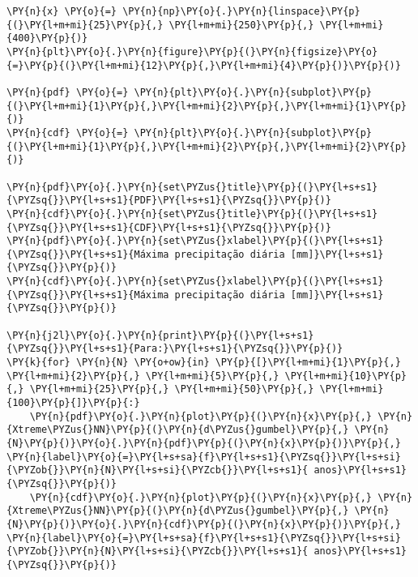     \begin{tcolorbox}[breakable, size=fbox, boxrule=1pt, pad at break*=1mm,colback=cellbackground, colframe=cellborder]
\begin{Verbatim}[commandchars=\\\{\}]
\PY{n}{x} \PY{o}{=} \PY{n}{np}\PY{o}{.}\PY{n}{linspace}\PY{p}{(}\PY{l+m+mi}{25}\PY{p}{,} \PY{l+m+mi}{250}\PY{p}{,} \PY{l+m+mi}{400}\PY{p}{)}
\PY{n}{plt}\PY{o}{.}\PY{n}{figure}\PY{p}{(}\PY{n}{figsize}\PY{o}{=}\PY{p}{(}\PY{l+m+mi}{12}\PY{p}{,}\PY{l+m+mi}{4}\PY{p}{)}\PY{p}{)}

\PY{n}{pdf} \PY{o}{=} \PY{n}{plt}\PY{o}{.}\PY{n}{subplot}\PY{p}{(}\PY{l+m+mi}{1}\PY{p}{,}\PY{l+m+mi}{2}\PY{p}{,}\PY{l+m+mi}{1}\PY{p}{)}
\PY{n}{cdf} \PY{o}{=} \PY{n}{plt}\PY{o}{.}\PY{n}{subplot}\PY{p}{(}\PY{l+m+mi}{1}\PY{p}{,}\PY{l+m+mi}{2}\PY{p}{,}\PY{l+m+mi}{2}\PY{p}{)}

\PY{n}{pdf}\PY{o}{.}\PY{n}{set\PYZus{}title}\PY{p}{(}\PY{l+s+s1}{\PYZsq{}}\PY{l+s+s1}{PDF}\PY{l+s+s1}{\PYZsq{}}\PY{p}{)}
\PY{n}{cdf}\PY{o}{.}\PY{n}{set\PYZus{}title}\PY{p}{(}\PY{l+s+s1}{\PYZsq{}}\PY{l+s+s1}{CDF}\PY{l+s+s1}{\PYZsq{}}\PY{p}{)}
\PY{n}{pdf}\PY{o}{.}\PY{n}{set\PYZus{}xlabel}\PY{p}{(}\PY{l+s+s1}{\PYZsq{}}\PY{l+s+s1}{Máxima precipitação diária [mm]}\PY{l+s+s1}{\PYZsq{}}\PY{p}{)}
\PY{n}{cdf}\PY{o}{.}\PY{n}{set\PYZus{}xlabel}\PY{p}{(}\PY{l+s+s1}{\PYZsq{}}\PY{l+s+s1}{Máxima precipitação diária [mm]}\PY{l+s+s1}{\PYZsq{}}\PY{p}{)}

\PY{n}{j2l}\PY{o}{.}\PY{n}{print}\PY{p}{(}\PY{l+s+s1}{\PYZsq{}}\PY{l+s+s1}{Para:}\PY{l+s+s1}{\PYZsq{}}\PY{p}{)}
\PY{k}{for} \PY{n}{N} \PY{o+ow}{in} \PY{p}{[}\PY{l+m+mi}{1}\PY{p}{,} \PY{l+m+mi}{2}\PY{p}{,} \PY{l+m+mi}{5}\PY{p}{,} \PY{l+m+mi}{10}\PY{p}{,} \PY{l+m+mi}{25}\PY{p}{,} \PY{l+m+mi}{50}\PY{p}{,} \PY{l+m+mi}{100}\PY{p}{]}\PY{p}{:}
    \PY{n}{pdf}\PY{o}{.}\PY{n}{plot}\PY{p}{(}\PY{n}{x}\PY{p}{,} \PY{n}{Xtreme\PYZus{}NN}\PY{p}{(}\PY{n}{d\PYZus{}gumbel}\PY{p}{,} \PY{n}{N}\PY{p}{)}\PY{o}{.}\PY{n}{pdf}\PY{p}{(}\PY{n}{x}\PY{p}{)}\PY{p}{,} \PY{n}{label}\PY{o}{=}\PY{l+s+sa}{f}\PY{l+s+s1}{\PYZsq{}}\PY{l+s+si}{\PYZob{}}\PY{n}{N}\PY{l+s+si}{\PYZcb{}}\PY{l+s+s1}{ anos}\PY{l+s+s1}{\PYZsq{}}\PY{p}{)}
    \PY{n}{cdf}\PY{o}{.}\PY{n}{plot}\PY{p}{(}\PY{n}{x}\PY{p}{,} \PY{n}{Xtreme\PYZus{}NN}\PY{p}{(}\PY{n}{d\PYZus{}gumbel}\PY{p}{,} \PY{n}{N}\PY{p}{)}\PY{o}{.}\PY{n}{cdf}\PY{p}{(}\PY{n}{x}\PY{p}{)}\PY{p}{,} \PY{n}{label}\PY{o}{=}\PY{l+s+sa}{f}\PY{l+s+s1}{\PYZsq{}}\PY{l+s+si}{\PYZob{}}\PY{n}{N}\PY{l+s+si}{\PYZcb{}}\PY{l+s+s1}{ anos}\PY{l+s+s1}{\PYZsq{}}\PY{p}{)}


\end{Verbatim}
\end{tcolorbox}
